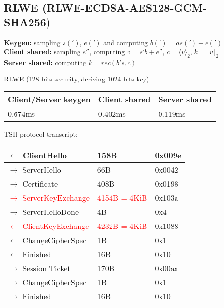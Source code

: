 \documentclass[12pt]{article}
\begin{document}
\subsection{RLWE \tiny{(RLWE-ECDSA-AES128-GCM-SHA256)}}

\footnotesize{\textbf{Keygen:} sampling $s(')$, $e(')$ and computing $b(') = as(') + e(')$\\
\textbf{Client shared:} sampling $e''$, computing $v = s'b + e''$, $c = \langle v \rangle_2$, $k = \lfloor v \rceil_2$\\
\textbf{Server shared:} computing $k = rec(b's, c)$}\\
\normalsize

RLWE (128 bits security, deriving 1024 bits key)
\begin{center}
    \begin{tabular}{| l | l | l |}
    \hline
    Client/Server keygen & Client shared & Server shared \\ \hline
    0.674ms & 0.402ms & 0.119ms  \\ \hline
    \end{tabular}
\end{center}

TSH protocol transcript:
\begin{center}
    \begin{tabular}{| l | l | l |}
    \hline
    $\leftarrow$ ClientHello & 158B & 0x009e\\ \hline
    $\rightarrow$ ServerHello & 66B & 0x0042\\ \hline
    $\rightarrow$ Certificate & 408B & 0x0198\\ \hline
    \textcolor{red}{$\rightarrow$ ServerKeyExchange} & \textcolor{red}{4154B = 4KiB} & 0x103a\\ \hline
    $\rightarrow$ ServerHelloDone & 4B & 0x4\\ \hline
    \textcolor{red}{$\leftarrow$ ClientKeyExchange} & \textcolor{red}{4232B = 4KiB} & 0x1088\\ \hline
    $\leftarrow$ ChangeCipherSpec & 1B & 0x1\\ \hline
    $\leftarrow$ Finished & 16B & 0x10\\ \hline
    $\rightarrow$ Session Ticket & 170B & 0x00aa\\ \hline
    $\rightarrow$ ChangeCipherSpec & 1B & 0x1\\ \hline
    $\rightarrow$ Finished & 16B & 0x10\\ \hline
    \end{tabular}
\end{center}
\end{document}
